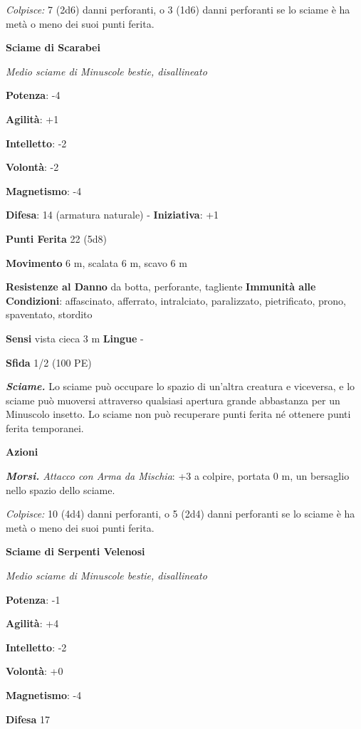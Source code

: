 \begin{multicols}{2}
\emph{Colpisce:} 7 (2d6) danni perforanti, o 3 (1d6) danni perforanti se
lo sciame è ha metà o meno dei suoi punti ferita.

\textbf{Sciame di Scarabei}

\emph{Medio sciame di Minuscole bestie, disallineato}

\textbf{Potenza}: -4

\textbf{Agilità}: +1

\textbf{Intelletto}: -2

\textbf{Volontà}: -2

\textbf{Magnetismo}: -4

\textbf{Difesa}: 14 (armatura naturale) - \textbf{Iniziativa}: +1

\textbf{Punti Ferita} 22 (5d8)

\textbf{Movimento} 6 m, scalata 6 m, scavo 6 m

\textbf{Resistenze al Danno} da botta, perforante, tagliente
\textbf{Immunità alle Condizioni}: affascinato, afferrato, intralciato,
paralizzato, pietrificato, prono, spaventato, stordito

\textbf{Sensi} vista cieca 3 m \textbf{Lingue} -

\textbf{Sfida} 1/2 (100 PE)\smallskip

\emph{\textbf{Sciame.}} Lo sciame può occupare lo spazio di un'altra
creatura e viceversa, e lo sciame può muoversi attraverso qualsiasi
apertura grande abbastanza per un Minuscolo insetto. Lo sciame non può
recuperare punti ferita né ottenere punti ferita temporanei.

\smallskip\textbf{Azioni}

\emph{\textbf{Morsi.} Attacco con Arma da Mischia}: +3 a colpire,
portata 0 m, un bersaglio nello spazio dello sciame.

\emph{Colpisce:} 10 (4d4) danni perforanti, o 5 (2d4) danni perforanti
se lo sciame è ha metà o meno dei suoi punti ferita.



\textbf{Sciame di Serpenti Velenosi}

\emph{Medio sciame di Minuscole bestie, disallineato}

\textbf{Potenza}: -1

\textbf{Agilità}: +4

\textbf{Intelletto}: -2

\textbf{Volontà}: +0

\textbf{Magnetismo}: -4

\textbf{Difesa} 17


\end{multicols}
